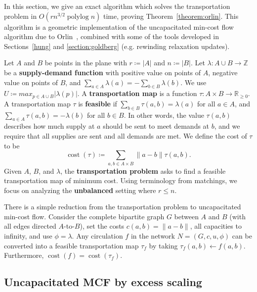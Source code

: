 \documentclass[11pt]{article}
\def\polylog{\mathop{\mathrm{polylog}}}
\def\reals{\mathbb{R}}
\def\ints{\mathbb{Z}}
\def\abs#1{\mathopen| #1 \mathclose|}		%
\def\norm#1{\mathopen\| #1 \mathclose\|}	%
\def\tsupply{\lambda}
\def\fsupply{\phi}
\def\cost{\operatorname{cost}}
\theoremstyle{plain}
\numberwithin{figure}{section}
\def\EMPH#1{\textbf{\boldmath #1}}
\begin{document}

In this section, we give an exact algorithm which solves the transportation
problem in $O(rn^{3/2}\polylog n)$ time, proving Theorem~\ref{theorem:orlin}.
This algorithm is a geometric implementation of the uncapacitated min-cost flow
algorithm due to Orlin~\cite{O93}, combined with some of the tools developed
in Sections~\ref{hung} and \ref{section:goldberg} (e.g. rewinding relaxation
updates).

Let $A$ and $B$ be points in the plane with $r \coloneqq \abs{A}$ and
$n \coloneqq \abs{B}$.
Let $\tsupply:A \cup B \to \ints$ be a \EMPH{supply-demand function} with
positive value on points of $A$, negative value on points of $B$, and
$\sum_{a \in A} \tsupply(a) = - \sum_{b \in B} \tsupply(b)$.
We use $U \coloneqq max_{p \in A \cup B} \abs{\tsupply(p)}$.
A \EMPH{transportation map} is a function
$\tau: A \times B \to \reals_{\geq 0}$.
A transportation map $\tau$ is \EMPH{feasible} if
$\sum_{b \in B} \tau(a, b) = \tsupply(a)$ for all $a \in A$, and
$\sum_{a \in A} \tau(a, b) = -\tsupply(b)$ for all $b \in B$.
In other words, the value $\tau(a, b)$ describes how much supply at $a$ should
be sent to meet demands at $b$, and we require that all supplies are sent
and all demands are met.
We define the cost of $\tau$ to be
\[
	\cost(\tau) \coloneqq \sum_{a, b \in A \times B} \norm{a-b} \tau(a, b).
\]
Given $A$, $B$, and $\tsupply$, the \EMPH{transportation problem} asks to find
a feasible transportation map of minimum cost.
Using terminology from matchings, we focus on analyzing the \EMPH{unbalanced}
setting where $r \leq n$.

There is a simple reduction from the transportation problem to uncapacitated
min-cost flow.
Consider the complete bipartite graph $G$ between $A$ and $B$ (with all edges
directed $A$-to-$B$), set the costs $c(a, b) = \norm{a-b}$, all capacities to
infinity, and use $\fsupply = \tsupply$.
Any circulation $f$ in the network $N = (G, c, u, \fsupply)$ can be converted
into a feasible transportation map $\tau_f$ by taking
$\tau_f(a, b) \gets f(a, b)$.
Furthermore, $\cost(f) = \cost(\tau_f)$.

\subsection{Uncapacitated MCF by excess scaling}
\end{document}
